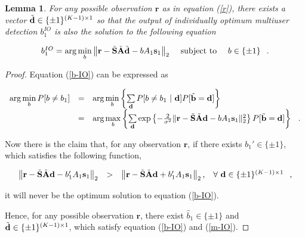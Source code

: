 \documentclass[a4paper,12pt,fleqn]{article}
\newtheorem{lemma}{Lemma}
\newcommand{\br}{{\mathbf r}}
\newcommand{\bA}{{\mathbf A}}
\newcommand{\bb}{{\bf b}}
\newcommand{\bd}{{\bf d}}
\newcommand{\bs}{{\bf s}}
\newcommand{\bS}{{\bf S}}
\begin{document}
\begin{lemma}
For any possible observation $\br$ as in equation (\ref{r}), there
exists a vector $\tilde{\bd}\in\{\pm 1\}^{(K-1)\times 1}$ so that
the output of individually optimum multiuser detection $b_1^{IO}$
is also the solution to the following equation

\begin{equation}
\begin{array}{rcl}
b_1^{IO}=\mbox{arg}\min\limits_{b}\left\|\br-\tilde{\bS}\tilde{\bA}\tilde{\bd}-bA_1\bs_1\right\|_2&\mbox{
subject to }& b\in\{\pm1\}\hspace{0.1in}.
\end{array}\label{m-IO}
\end{equation}
\label{IO-IC}\label{Lemma-IO}
\end{lemma}

\begin{proof}

Equation (\ref{b-IO}) can be expressed as

\begin{equation}
\begin{array}{rcl}
\mbox{arg}\min\limits_{b} P[b\neq
b_1]&=&\mbox{arg}\min\limits_{b}\left\{\sum\limits_{\bd}P[b\neq
b_1\ |\ \bd]P[\tilde{\bb}=\bd]\right\}\\
&=&\mbox{arg}\max\limits_{b}\left\{\sum\limits_{\bd}\exp\left\{-{2\over\sigma^2}\|\br-\tilde{\bS}\tilde{\bA}\bd-bA_1\bs_1\|_2^2\right\}P[\tilde{\bb}=\bd]\right\}
\hspace{0.1in}.
\end{array}
\end{equation}

Now there is the claim that, for any observation $\br$, if there
exists $b_1'\in\{\pm 1\}$, which satisfies the following function,


\begin{equation}
\begin{array}{rccl}
\left\|\br-\tilde{\bS}\tilde{\bA}\bd-b_1'A_1\bs_1\right\|_2&>&\left\|\br-\tilde{\bS}\tilde{\bA}\bd+b_1'A_1\bs_1\right\|_2\mbox{,}&\forall\
\bd\in\{\pm 1\}^{(K-1)\times 1}\hspace{0.1in},
\end{array}
\end{equation}

\noindent it will never be the optimum solution to equation
(\ref{b-IO}).

Hence, for any possible observation $\br$, there exist
$\hat{b}_1\in\{\pm 1\}$ and $\tilde{\bd}\in\{\pm 1\}^{(K-1)\times
1}$, which satisfy equation (\ref{b-IO}) and (\ref{m-IO}).
\end{proof}
\end{document}
